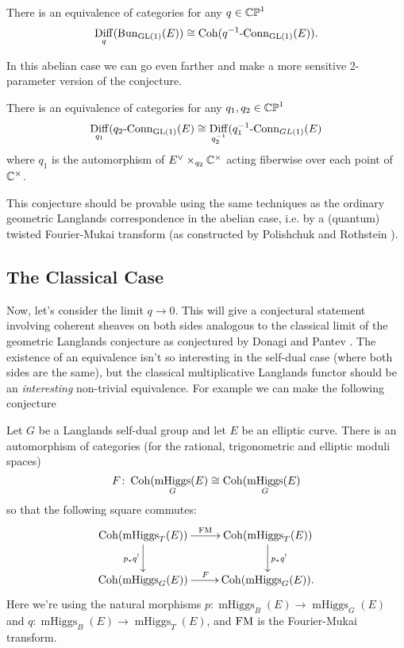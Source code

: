 \documentclass[10pt, oneside]{article}
\DeclareMathOperator{\mhiggs}{mHiggs}
\renewcommand{\conn}{\text{-Conn}}
\DeclareMathOperator{\diff}{Diff}
\begin{document}
\begin{conjecture}
There is an equivalence of categories for any $q \in \mathbb{CP}^1$
\[\diff_q(\bun_{\GL(1)}(E)) \iso \coh(q^{-1}\conn_{\GL(1)}(E)).\]
\end{conjecture}

In this abelian case we can go even farther and make a more sensitive 2-parameter version of the conjecture.

\begin{conjecture}
There is an equivalence of categories for any $q_1, q_2 \in \mathbb{CP}^1$
\[\diff_{q_1}(q_2\conn_{\GL(1)}(E) \iso \diff_{q_2^{-1}}(q_1^{-1}\conn_{GL(1)}(E)\]
where $q_1$ is the automorphism of $E^\vee \times_{q_2} \mathbb{C}^\times$ acting fiberwise over each point of $\mathbb{C}^\times$.
\end{conjecture}

This conjecture should be provable using the same techniques as the ordinary geometric Langlands correspondence in the abelian case, i.e. by a (quantum) twisted Fourier-Mukai transform (as constructed by Polishchuk and Rothstein \cite{PolishchukRothstein}).

\subsection{The Classical Case}
Now, let's consider the limit $q \to 0$.  This will give a conjectural statement involving coherent sheaves on both sides analogous to the classical limit of the geometric Langlands conjecture as conjectured by Donagi and Pantev \cite{DonagiPantev}.  The existence of an equivalence isn't so interesting in the self-dual case (where both sides are the same), but the classical multiplicative Langlands functor should be an \emph{interesting} non-trivial equivalence.  For example we can make the following conjecture

\begin{conjecture}
Let $G$ be a Langlands self-dual group and let $E$ be an elliptic curve.  There is an automorphism of categories (for the rational, trigonometric and elliptic moduli spaces)
\[F \colon \coh(\mhiggs_G(E) \iso \coh(\mhiggs_{G}(E)\]
so that the following square commutes:
\[\xymatrix{
\coh(\mhiggs_T(E)) \ar[r]^{\mathrm{FM}} \ar[d]_{p_*q^!} &\coh(\mhiggs_T(E)) \ar[d]^{p_*q^!} \\
\coh(\mhiggs_G(E)) \ar[r]^{F} &\coh(\mhiggs_G(E)).
}\]
Here we're using the natural morphisms $p \colon \mhiggs_B(E) \to \mhiggs_G(E)$ and $q \colon \mhiggs_B(E) \to \mhiggs_T(E)$, and $\mathrm{FM}$ is the Fourier-Mukai transform.
\end{conjecture}
\end{document}
